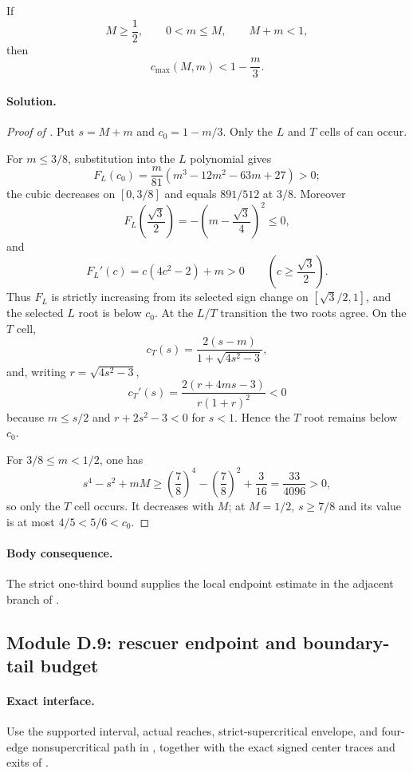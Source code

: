 \begin{lemma}
\label{lem:app-one-third-radial-envelope}
If
\[
 M\ge\frac12,\qquad 0<m\le M,\qquad M+m<1,
\]
then
\[
 \boxed{c_{\max}(M,m)<1-\frac m3.}
\]
\end{lemma}

\paragraph{Solution.}

\begin{proof}[Proof of ]
Put $s=M+m$ and $c_0=1-m/3$.  Only the $L$ and $T$ cells of
 can occur.

For $m\le3/8$, substitution into the $L$ polynomial gives
\[
 F_L(c_0)
 =
 \frac m{81}(m^3-12m^2-63m+27)>0;
\]
the cubic decreases on $[0,3/8]$ and equals $891/512$ at $3/8$.
Moreover
\[
 F_L\!\left(\frac{\sqrt3}{2}\right)
 =-\left(m-\frac{\sqrt3}{4}\right)^2\le0,
\]
and
\[
 F_L'(c)=c(4c^2-2)+m>0
 \qquad\left(c\ge\frac{\sqrt3}{2}\right).
\]
Thus $F_L$ is strictly increasing from its selected sign change on
$[\sqrt3/2,1]$, and the selected $L$ root is below $c_0$.  At the $L/T$
transition the two roots agree.  On the $T$ cell,
\[
 c_T(s)=\frac{2(s-m)}{1+\sqrt{4s^2-3}},
\]
and, writing $r=\sqrt{4s^2-3}$,
\[
 c_T'(s)=\frac{2(r+4ms-3)}{r(1+r)^2}<0
\]
because $m\le s/2$ and $r+2s^2-3<0$ for $s<1$.  Hence the $T$ root remains
below $c_0$.

For $3/8\le m<1/2$, one has
\[
 s^4-s^2+mM
 \ge
 \left(\frac78\right)^4-\left(\frac78\right)^2+\frac3{16}
 =\frac{33}{4096}>0,
\]
so only the $T$ cell occurs.  It decreases with $M$; at $M=1/2$,
$s\ge7/8$ and its value is at most $4/5<5/6<c_0$.
\end{proof}

\paragraph{Body consequence.}
The strict one-third bound supplies the local endpoint estimate in the
adjacent branch of .

\subsection{Module D.9: rescuer endpoint and boundary-tail budget}

\paragraph{Exact interface.}
Use the supported interval, actual reaches, strict-supercritical envelope,
and four-edge nonsupercritical path in
, together
with the exact signed center traces and exits of
.

